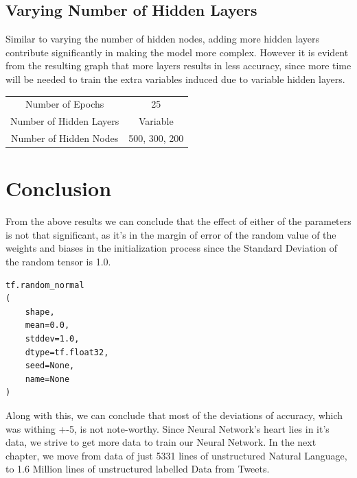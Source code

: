 \subsection{Varying Number of Hidden Layers}
Similar to varying the number of hidden nodes, adding more hidden layers contribute significantly in making the model more complex. However it is evident from the resulting graph that more layers results in less accuracy, since more time will be needed to train the extra variables induced due to variable hidden layers.

\begin{center}
\begin{tabular}{| c | c |}
\hline
Number of Epochs & 25\\
Number of Hidden Layers & Variable\\
Number of Hidden Nodes & 500, 300, 200\\
\hline
\end{tabular}
\end{center}




\section{Conclusion}
From the above results we can conclude that the effect of either of the parameters is not that significant, as it's in the margin of error of the random value of the weights and biases in the initialization process since the Standard Deviation of the random tensor is 1.0. 

\begin{verbatim}
tf.random_normal
(
    shape,
    mean=0.0,
    stddev=1.0,
    dtype=tf.float32,
    seed=None,
    name=None
)
\end{verbatim}

Along with this, we can conclude that most of the deviations of accuracy, which was withing +-5, is not note-worthy.\newline
Since Neural Network's heart lies in it's data, we strive to get more data to train our Neural Network. In the next chapter, we move from data  of just 5331 lines of unstructured Natural Language, to 1.6 Million lines of unstructured labelled Data from Tweets.